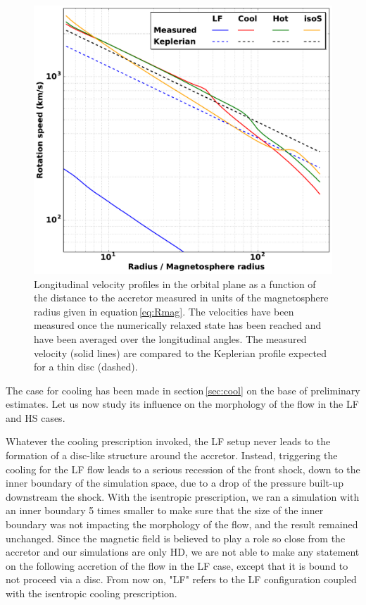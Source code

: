 \documentclass{aa}
\begin{document}
\begin{figure}
\centering
\includegraphics[width=0.95\columnwidth]{Pictures/v_phi_Kep.pdf}
\caption{Longitudinal velocity profiles in the orbital plane as a function of the distance to the accretor measured in units of the magnetosphere radius given in equation\,\eqref{eq:Rmag}. The velocities have been measured once the numerically relaxed state has been reached and have been averaged over the longitudinal angles. The measured velocity (solid lines) are compared to the Keplerian profile expected for a thin disc (dashed).}
\label{fig:vphi}
\end{figure} 

The case for cooling has been made in section\,\ref{sec:cool} on the base of preliminary estimates. Let us now study its influence on the morphology of the flow in the LF and HS cases.

Whatever the cooling prescription invoked, the LF setup never leads to the formation of a disc-like structure around the accretor. Instead, triggering the cooling for the LF flow leads to a serious recession of the front shock, down to the inner boundary of the simulation space, due to a drop of the pressure built-up downstream the shock. With the isentropic prescription, we ran a simulation with an inner boundary 5 times smaller to make sure that the size of the inner boundary was not impacting the morphology of the flow, and the result remained unchanged. Since the magnetic field is believed to play a role so close from the accretor and our simulations are only HD, we are not able to make any statement on the following accretion of the flow in the LF case, except that it is bound to not proceed via a disc. From now on, "LF" refers to the LF configuration coupled with the isentropic cooling prescription.
\end{document}
